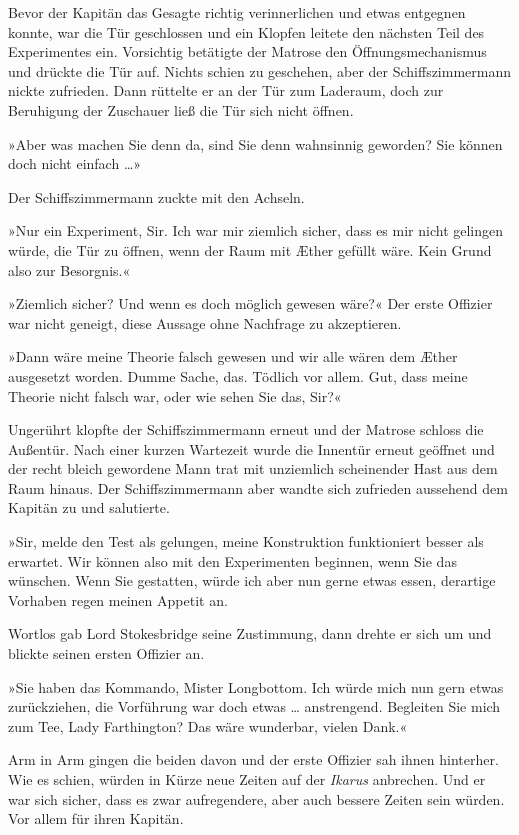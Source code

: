 Bevor der Kapitän das Gesagte richtig verinnerlichen und etwas
entgegnen konnte, war die Tür geschlossen und ein Klopfen leitete
den nächsten Teil des Experimentes ein. Vorsichtig betätigte der
Matrose den Öffnungsmechanismus und drückte die Tür auf. Nichts
schien zu geschehen, aber der Schiffszimmermann nickte zufrieden.
Dann rüttelte er an der Tür zum Laderaum, doch zur Beruhigung der
Zuschauer ließ die Tür sich nicht öffnen.

»Aber was machen Sie denn da, sind Sie denn wahnsinnig geworden?
Sie können doch nicht einfach \ldots{}»

Der Schiffszimmermann zuckte mit den Achseln.

»Nur ein Experiment, Sir. Ich war mir ziemlich sicher, dass es mir
nicht gelingen würde, die Tür zu öffnen, wenn der Raum mit Æther
gefüllt wäre. Kein Grund also zur Besorgnis.«

»Ziemlich sicher? Und wenn es doch möglich gewesen wäre?« Der erste
Offizier war nicht geneigt, diese Aussage ohne Nachfrage zu
akzeptieren.

»Dann wäre meine Theorie falsch gewesen und wir alle wären dem
Æther ausgesetzt worden. Dumme Sache, das. Tödlich vor allem. Gut,
dass meine Theorie nicht falsch war, oder wie sehen Sie das, Sir?«

Ungerührt klopfte der Schiffszimmermann erneut und der Matrose
schloss die Außentür. Nach einer kurzen Wartezeit wurde die
Innentür erneut geöffnet und der recht bleich gewordene Mann trat
mit unziemlich scheinender Hast aus dem Raum hinaus. Der
Schiffszimmermann aber wandte sich zufrieden aussehend dem Kapitän
zu und salutierte.

»Sir, melde den Test als gelungen, meine Konstruktion funktioniert
besser als erwartet. Wir können also mit den Experimenten beginnen,
wenn Sie das wünschen. Wenn Sie gestatten, würde ich aber nun gerne
etwas essen, derartige Vorhaben regen meinen Appetit an.

Wortlos gab Lord Stokesbridge seine Zustimmung, dann drehte er sich
um und blickte seinen ersten Offizier an.

»Sie haben das Kommando, Mister Longbottom. Ich würde mich nun gern
etwas zurückziehen, die Vorführung war doch etwas \ldots{} anstrengend.
Begleiten Sie mich zum Tee, Lady Farthington? Das wäre wunderbar,
vielen Dank.«

Arm in Arm gingen die beiden davon und der erste Offizier sah ihnen
hinterher. Wie es schien, würden in Kürze neue Zeiten auf der
\emph{Ikarus} anbrechen. Und er war sich sicher, dass es zwar
aufregendere, aber auch bessere Zeiten sein würden. Vor allem für
ihren Kapitän.


